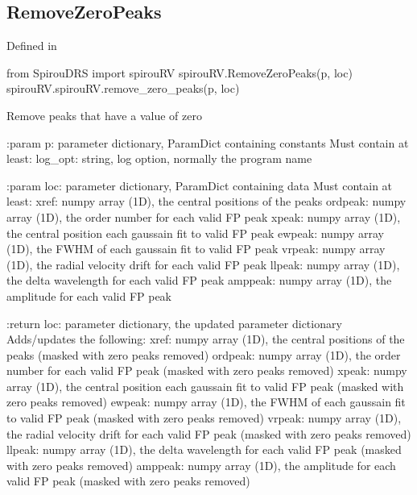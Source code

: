 \noindent\begin{minipage}{\textwidth}
\subsection{RemoveZeroPeaks}

Defined in \spirouRV{}

\begin{pythonbox}
from SpirouDRS import spirouRV
spirouRV.RemoveZeroPeaks(p, loc)
spirouRV.spirouRV.remove_zero_peaks(p, loc)
\end{pythonbox}

\begin{pythondocstring}
Remove peaks that have a value of zero

:param p: parameter dictionary, ParamDict containing constants
    Must contain at least:
            log_opt: string, log option, normally the program name

:param loc: parameter dictionary, ParamDict containing data
        Must contain at least:
            xref: numpy array (1D), the central positions of the peaks
            ordpeak: numpy array (1D), the order number for each valid FP
                     peak
            xpeak: numpy array (1D), the central position each gaussain fit
                   to valid FP peak
            ewpeak: numpy array (1D), the FWHM of each gaussain fit
                    to valid FP peak
            vrpeak: numpy array (1D), the radial velocity drift for each
                    valid FP peak
            llpeak: numpy array (1D), the delta wavelength for each valid
                    FP peak
            amppeak: numpy array (1D), the amplitude for each valid FP peak

:return loc: parameter dictionary, the updated parameter dictionary
        Adds/updates the following:
            xref: numpy array (1D), the central positions of the peaks
                  (masked with zero peaks removed)
            ordpeak: numpy array (1D), the order number for each valid FP
                     peak (masked with zero peaks removed)
            xpeak: numpy array (1D), the central position each gaussain fit
                   to valid FP peak (masked with zero peaks removed)
            ewpeak: numpy array (1D), the FWHM of each gaussain fit
                    to valid FP peak (masked with zero peaks removed)
            vrpeak: numpy array (1D), the radial velocity drift for each
                    valid FP peak (masked with zero peaks removed)
            llpeak: numpy array (1D), the delta wavelength for each valid
                    FP peak (masked with zero peaks removed)
            amppeak: numpy array (1D), the amplitude for each valid FP peak
                     (masked with zero peaks removed)
\end{pythondocstring}
\end{minipage}

